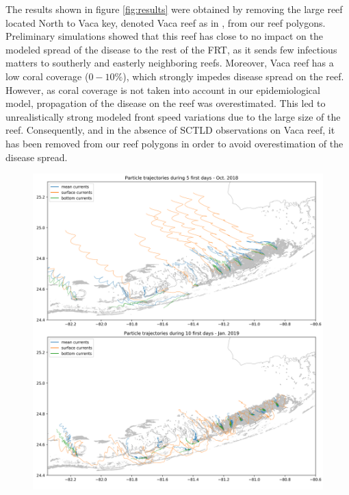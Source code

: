\documentclass[utf8]{frontiersSCNS}
\begin{document}
The results shown in figure \ref{fig:results} were obtained by removing the large reef located North to Vaca key, denoted Vaca reef as in \cite{frys20}, from our reef polygons. Preliminary simulations showed that this reef has close to no impact on the modeled spread of the disease to the rest of the FRT, as it sends few infectious matters to southerly and easterly neighboring reefs. Moreover, Vaca reef has a low coral coverage ($0-10\%$), which strongly impedes disease spread on the reef. However, as coral coverage is not taken into account in our epidemiological model, propagation of the disease on the reef was overestimated. This led to unrealistically strong modeled front speed variations due to the large size of the reef. Consequently, and in the absence of SCTLD observations on Vaca reef, it has been removed from our reef polygons in order to avoid overestimation of the disease spread.

\begin{figure}
    \centering
    \includegraphics[width=.9\textwidth]{figures/traj.png}
    \caption{}
    \label{fig:traj}
\end{figure}

\end{document}
